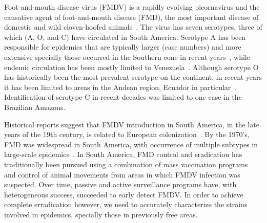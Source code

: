 \documentclass[10pt]{article}
\begin{document}
Foot-and-mouth disease virus (FMDV) is a rapidly evolving picornavirus and the causative agent of foot-and-mouth disease (FMD), the most important disease of domestic and wild cloven-hoofed animals~\cite{review}.
The virus has seven serotypes, three of which (A, O, and C) have circulated in South America.
Serotype A has been responsible for epidemics that are typically larger (case numbers) and more extensive specially those occurred in the 
Southern cone in recent years~\cite{Perez2001, Malirat2012}, while endemic circulation has been mostly limited to Venezuela~\cite{andean}.
Although serotype O has historically been the most prevalent serotype on the continent, in recent years it has been limited to areas in the Andean region, Ecuador in particular~\cite{andean}.
Identification of serotype C in recent decades was limited to one case in the Brazilian Amazons.

Historical reports suggest that FMDV introduction in South America, in the late years of the 19th century, is  related to European colonization~\cite{tully}. 
By the 1970's, FMD was widespread in South America, with occurrence of multiple subtypes in large-scale epidemics~\cite{Saraiva2003}.
In South America, FMD control and eradication has traditionally been pursued using a combination of mass vaccination programs~\cite{vaccinationSA} and control of animal movements from areas in which FMDV infection was suspected.
Over time, passive and active surveillance programs have, with heterogeneous success, succeeded to early detect FMDV.
In order to achieve complete erradication however, we need to accurately characterize the strains involved in epidemics, specially those in previously free areas.
\end{document}
